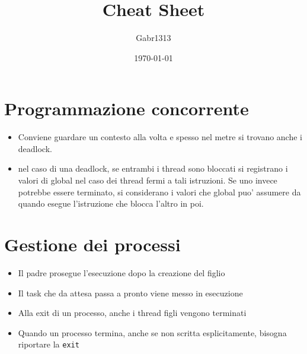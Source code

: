 \documentclass[12pt, a4paper]{report}
\title{Cheat Sheet}
\author{Gabr1313}
\date{\today}
\begin{document}
\justify
\sloppy
\maketitle

\section*{Programmazione concorrente}
\begin{itemize}
	\item Conviene guardare un contesto alla volta e spesso nel metre si trovano
	      anche i deadlock.
	\item nel caso di una deadlock, se entrambi i thread sono bloccati si
	      registrano i valori di global nel caso dei thread fermi a tali
	      istruzioni. Se uno invece potrebbe essere terminato, si considerano i
	      valori che global puo' assumere da quando esegue l'istruzione che blocca
	      l'altro in poi.
\end{itemize}

\newpage
\section*{Gestione dei processi}
\begin{itemize}
	\item Il padre prosegue l'esecuzione dopo la creazione del figlio
	\item Il task che da attesa passa a pronto viene messo in esecuzione
	\item Alla exit di un processo, anche i thread figli vengono terminati
	\item Quando un processo termina, anche se non scritta esplicitamente,
	      bisogna riportare la \texttt{exit}
\end{itemize}


\newpage
\end{document}
